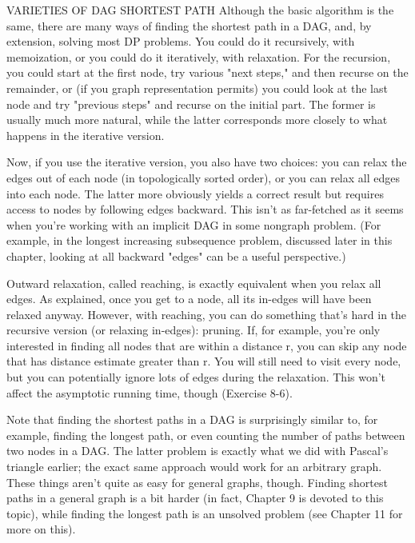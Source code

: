 \begin{notice}{VARIETIES OF DAG SHORTEST PATH}
Although the basic algorithm is the same, there are many ways of finding the shortest path in a DAG, and, by extension, solving most DP problems. You could do it recursively, with memoization, or you could do it iteratively, with relaxation. For the recursion, you could start at the first node, try various "next steps," and then recurse on the remainder, or (if you graph representation permits) you could look at the last node and try "previous steps" and recurse on the initial part. The former is usually much more natural, while the latter corresponds more closely to what happens in the iterative version.

Now, if you use the iterative version, you also have two choices: you can relax the edges out of each node (in topologically sorted order), or you can relax all edges into each node. The latter more obviously yields a correct result but requires access to nodes by following edges backward. This isn't as far-fetched as it seems when you're working with an implicit DAG in some nongraph problem. (For example, in the longest increasing subsequence problem, discussed later in this chapter, looking at all backward "edges" can be a useful perspective.)

Outward relaxation, called reaching, is exactly equivalent when you relax all edges. As explained, once you get to a node, all its in-edges will have been relaxed anyway. However, with reaching, you can do something that's hard in the recursive version (or relaxing in-edges): pruning. If, for example, you're only interested in finding all nodes that are within a distance r, you can skip any node that has distance estimate greater than r. You will still need to visit every node, but you can potentially ignore lots of edges during the relaxation. This won't affect the asymptotic running time, though (Exercise 8-6).
\end{notice}
Note that finding the shortest paths in a DAG is surprisingly similar to, for example, finding the
longest path, or even counting the number of paths between two nodes in a DAG. The latter problem is exactly what we did with Pascal's triangle earlier; the exact same approach would work for an arbitrary graph. These things aren't quite as easy for general graphs, though. Finding shortest paths in a general graph is a bit harder (in fact, Chapter 9 is devoted to this topic), while finding the longest path is an unsolved problem (see Chapter 11 for more on this).

